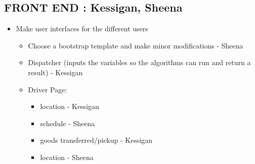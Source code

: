 \documentclass[paper=a4, fontsize=11pt]{scrartcl} %
\numberwithin{equation}{section} %
\numberwithin{figure}{section} %
\numberwithin{table}{section} %
\begin{document}
\subsection{	FRONT END : Kessigan, Sheena}

\begin{itemize}
	\item  Make user interfaces for the different users

		\begin{itemize}
		 \item Choose a bootstrap template and make minor modifications - Sheena
		
		\item Dispatcher (inputs the variables so the algorithms can run and return a result) - Kessigan
		\item Driver Page:		
			\begin{itemize} 
		\item location - Kessigan
																
					\item schedule	- Sheena
					\item goods transferred/pickup - Kessigan
					\item location - Sheena
		\end{itemize}
		
		\end{itemize}
	
	
\end{itemize}


\end{document}
